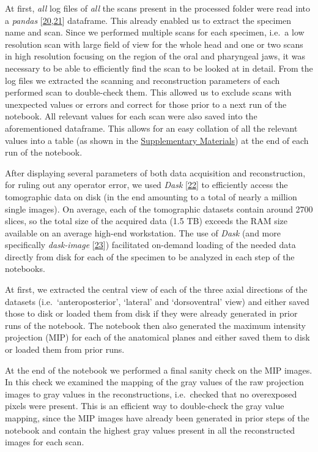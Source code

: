 At first, \emph{all} log files of \emph{all} the scans present in the processed folder were read into a \emph{pandas} {[}\protect\hyperlink{ref-19qQOHlFN}{20},\protect\hyperlink{ref-U5AcoDOX}{21}{]} dataframe.
This already enabled us to extract the specimen name and scan.
Since we performed multiple scans for each specimen, i.e.~a low resolution scan with large field of view for the whole head and one or two scans in high resolution focusing on the region of the oral and pharyngeal jaws, it was necessary to be able to efficiently find the scan to be looked at in detail.
From the log files we extracted the scanning and reconstruction parameters of each performed scan to double-check them.
This allowed us to exclude scans with unexpected values or errors and correct for those prior to a next run of the notebook.
All relevant values for each scan were also saved into the aforementioned dataframe.
This allows for an easy collation of all the relevant values into a table (as shown in the \protect\hyperlink{supplementary-materials}{Supplementary Materials}) at the end of each run of the notebook.

After displaying several parameters of both data acquisition and reconstruction, for ruling out any operator error, we used \emph{Dask} {[}\protect\hyperlink{ref-hj1CnyWB}{22}{]} to efficiently access the tomographic data on disk (in the end amounting to a total of nearly a million single images).
On average, each of the tomographic datasets contain around 2700 slices, so the total size of the acquired data (1.5 TB) exceeds the RAM size available on an average high-end workstation.
The use of \emph{Dask} (and more specifically \emph{dask-image} {[}\protect\hyperlink{ref-wIfTDBqd}{23}{]}) facilitated on-demand loading of the needed data directly from disk for each of the specimen to be analyzed in each step of the notebooks.

At first, we extracted the central view of each of the three axial directions of the datasets (i.e.~`anteroposterior', `lateral' and `dorsoventral' view) and either saved those to disk or loaded them from disk if they were already generated in prior runs of the notebook.
The notebook then also generated the maximum intensity projection (MIP) for each of the anatomical planes and either saved them to disk or loaded them from prior runs.

At the end of the notebook we performed a final sanity check on the MIP images.
In this check we examined the mapping of the gray values of the raw projection images to gray values in the reconstructions, i.e.~checked that no overexposed pixels were present.
This is an efficient way to double-check the gray value mapping, since the MIP images have already been generated in prior steps of the notebook and contain the highest gray values present in all the reconstructed images for each scan.

